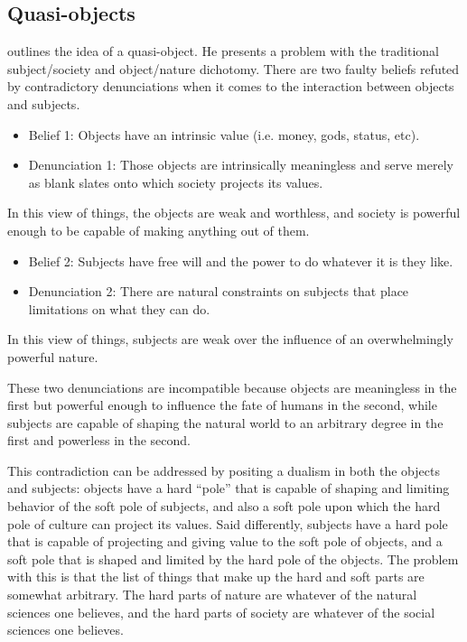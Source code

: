 \documentclass[a4paper]{article}
\begin{document}
\newpage
\begin{appendices}
\section{Quasi-objects}

\cite{latour2012we} outlines the idea of a quasi-object. He presents a problem
with the traditional subject/society and object/nature dichotomy. There are
two faulty beliefs refuted by contradictory denunciations when it comes to the
interaction between objects and subjects.
%
\begin{itemize}
    \item[] Belief 1: Objects have an intrinsic value (i.e. money, gods,
        status, etc).

    \item[] Denunciation 1: Those objects are intrinsically meaningless and
        serve merely as blank slates onto which society projects its values.
\end{itemize}
%
In this view of things, the objects are weak and worthless, and society is
powerful enough to be capable of making anything out of them. 
%
\begin{itemize}
    \item[] Belief 2: Subjects have free will and the power to do whatever it
        is they like.

    \item[] Denunciation 2: There are natural constraints on subjects that
        place limitations on what they can do. 
\end{itemize}
%
In this view of things, subjects are weak over the influence of an
overwhelmingly powerful nature. 

These two denunciations are incompatible because objects are
meaningless in the first but powerful enough to influence the fate of humans
in the second, while subjects are capable of shaping the natural world to an
arbitrary degree in the first and powerless in the second.

This contradiction can be addressed by positing a dualism in both the objects
and subjects: objects have a hard ``pole'' that is capable of shaping and
limiting behavior of the soft pole of subjects, and also a soft pole upon
which the hard pole of culture can project its values. Said differently,
subjects have a hard pole that is capable of projecting and giving value to
the soft pole of objects, and a soft pole that is shaped and limited by the
hard pole of the objects. The problem with this is that the list of things
that make up the hard and soft parts are somewhat arbitrary. The hard parts of
nature are whatever of the natural sciences one believes, and the hard parts
of society are whatever of the social sciences one believes.


\end{appendices}
\end{document}

